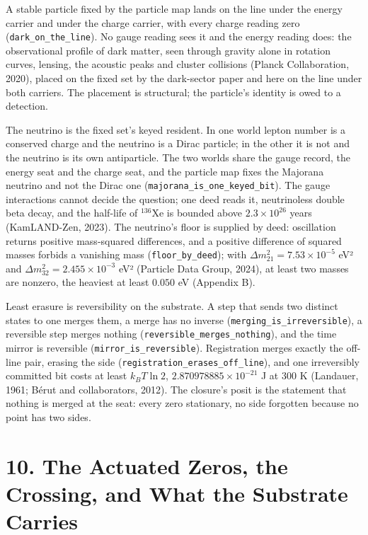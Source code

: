 \documentclass[10pt]{article}
\begin{document}
A stable particle fixed by the particle map lands on the line under the
energy carrier and under the charge carrier, with every charge reading
zero (\texttt{dark\_on\_the\_line}). No gauge reading sees it and the
energy reading does: the observational profile of dark matter, seen
through gravity alone in rotation curves, lensing, the acoustic peaks
and cluster collisions (Planck Collaboration, 2020), placed on the fixed
set by the dark-sector paper and here on the line under both carriers.
The placement is structural; the particle's identity is owed to a
detection.

The neutrino is the fixed set's keyed resident. In one world lepton
number is a conserved charge and the neutrino is a Dirac particle; in
the other it is not and the neutrino is its own antiparticle. The two
worlds share the gauge record, the energy seat and the charge seat, and
the particle map fixes the Majorana neutrino and not the Dirac one
(\texttt{majorana\_is\_one\_keyed\_bit}). The gauge interactions cannot
decide the question; one deed reads it, neutrinoless double beta decay,
and the half-life of \(^{136}\)Xe is bounded above \(2.3\times10^{26}\)
years (KamLAND-Zen, 2023). The neutrino's floor is supplied by deed:
oscillation returns positive mass-squared differences, and a positive
difference of squared masses forbids a vanishing mass
(\texttt{floor\_by\_deed}); with \(\Delta m^2_{21}=7.53\times10^{-5}\)
eV² and \(\Delta m^2_{32}=2.455\times10^{-3}\) eV² (Particle Data Group,
2024), at least two masses are nonzero, the heaviest at least \(0.050\)
eV (Appendix B).

Least erasure is reversibility on the substrate. A step that sends two
distinct states to one merges them, a merge has no inverse
(\texttt{merging\_is\_irreversible}), a reversible step merges nothing
(\texttt{reversible\_merges\_nothing}), and the time mirror is
reversible (\texttt{mirror\_is\_reversible}). Registration merges
exactly the off-line pair, erasing the side
(\texttt{registration\_erases\_off\_line}), and one irreversibly
committed bit costs at least \(k_BT\ln 2\),
\(2.870978885\times10^{-21}\) J at 300 K (Landauer, 1961; Bérut and
collaborators, 2012). The closure's posit is the statement that nothing
is merged at the seat: every zero stationary, no side forgotten because
no point has two sides.

\hypertarget{the-actuated-zeros-the-crossing-and-what-the-substrate-carries}{%
\section{10. The Actuated Zeros, the Crossing, and What the Substrate
Carries}\label{the-actuated-zeros-the-crossing-and-what-the-substrate-carries}}
\end{document}

